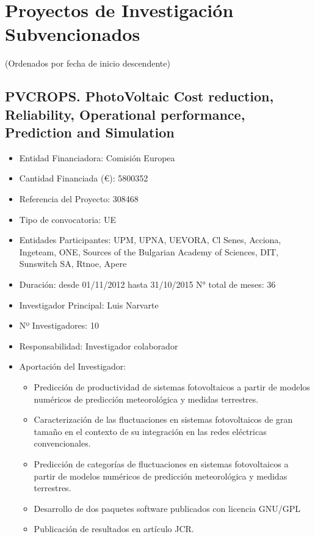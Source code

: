 \documentclass[article, a4paper]{memoir}
\begin{document}
\section{Proyectos de Investigación Subvencionados}
\label{sec:orgheadline50}
(Ordenados por fecha de inicio descendente)

\subsection{PVCROPS. PhotoVoltaic Cost reduction, Reliability, Operational performance, Prediction and Simulation}
\label{sec:orgheadline31}
\begin{itemize}
\item Entidad Financiadora: Comisión Europea
\item Cantidad Financiada (€): 5800352
\item Referencia del Proyecto: 308468
\item Tipo de convocatoria: UE
\item Entidades Participantes: UPM, UPNA, UEVORA, Cl Senes, Acciona, Ingeteam, ONE, Sources of the Bulgarian Academy of Sciences, DIT, Sunswitch SA, Rtnoe, Apere
\item Duración: desde 01/11/2012 hasta 31/10/2015 N° total de meses: 36
\item Investigador Principal: Luis Narvarte
\item Nº Investigadores: 10
\item Responsabilidad: Investigador colaborador
\item Aportación del Investigador:
\begin{itemize}
\item Predicción de productividad de sistemas fotovoltaicos a partir de modelos numéricos de predicción meteorológica y medidas terrestres.
\item Caracterización de las fluctuaciones en sistemas fotovoltaicos de gran tamaño en el contexto de su integración en las redes eléctricas convencionales.
\item Predicción de categorías de fluctuaciones en sistemas fotovoltaicos a partir de modelos numéricos de predicción meteorológica y medidas terrestres.
\item Desarrollo de dos paquetes software publicados con licencia GNU/GPL
\item Publicación de resultados en artículo JCR.
\end{itemize}
\end{itemize}
\end{document}
